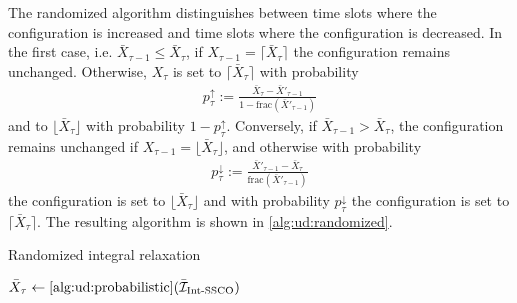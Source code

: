 The randomized algorithm distinguishes between time slots where the configuration is increased and time slots where the configuration is decreased. In the first case, i.e. $\bar{X}_{\tau-1} \leq \bar{X}_{\tau}$, if $X_{\tau-1} = \lceil\bar{X}_{\tau}\rceil$  the configuration remains unchanged. Otherwise, $X_{\tau}$ is set to $\lceil\bar{X}_{\tau}\rceil$ with probability \begin{align*}
    p_{\tau}^{\uparrow} := \frac{\bar{X}_{\tau} - \bar{X}'_{\tau-1}}{1 - \text{frac}(\bar{X}'_{\tau-1})}
\end{align*} and to $\lfloor\bar{X}_{\tau}\rfloor$ with probability $1 - p_{\tau}^{\uparrow}$. Conversely, if $\bar{X}_{\tau-1} > \bar{X}_{\tau}$, the configuration remains unchanged if $X_{\tau-1} = \lfloor\bar{X}_{\tau}\rfloor$, and otherwise with probability \begin{align*}
    p_{\tau}^{\downarrow} := \frac{\bar{X}'_{\tau-1} - \bar{X}_{\tau}}{\text{frac}(\bar{X}'_{\tau-1})}
\end{align*} the configuration is set to $\lfloor\bar{X}_{\tau}\rfloor$ and with probability $p_{\tau}^{\downarrow}$ the configuration is set to $\lceil\bar{X}_{\tau}\rceil$. The resulting algorithm is shown in \cref{alg:ud:randomized}.

\begin{algorithm}
    \caption{Randomized integral relaxation~\cite{Albers2018}}\label{alg:ud:randomized}
    $\bar{X}_{\tau} \gets \text{\cref{alg:ud:probabilistic}}(\bar{\mathcal{I}}_{\text{Int-SSCO}})$\;
\end{algorithm}

